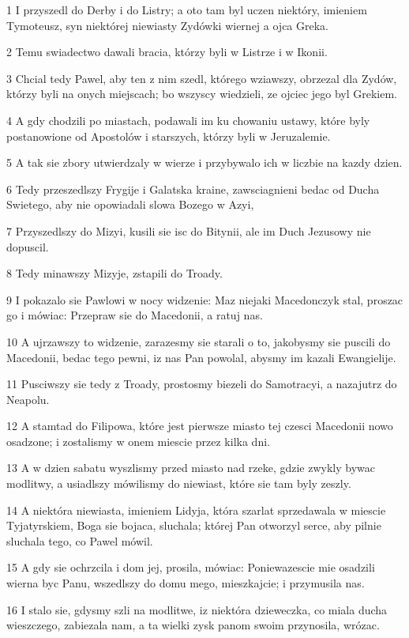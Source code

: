 \par 1 I przyszedl do Derby i do Listry; a oto tam byl uczen niektóry, imieniem Tymoteusz, syn niektórej niewiasty Zydówki wiernej a ojca Greka.
\par 2 Temu swiadectwo dawali bracia, którzy byli w Listrze i w Ikonii.
\par 3 Chcial tedy Pawel, aby ten z nim szedl, którego wziawszy, obrzezal dla Zydów, którzy byli na onych miejscach; bo wszyscy wiedzieli, ze ojciec jego byl Grekiem.
\par 4 A gdy chodzili po miastach, podawali im ku chowaniu ustawy, które byly postanowione od Apostolów i starszych, którzy byli w Jeruzalemie.
\par 5 A tak sie zbory utwierdzaly w wierze i przybywalo ich w liczbie na kazdy dzien.
\par 6 Tedy przeszedlszy Frygije i Galatska kraine, zawsciagnieni bedac od Ducha Swietego, aby nie opowiadali slowa Bozego w Azyi,
\par 7 Przyszedlszy do Mizyi, kusili sie isc do Bitynii, ale im Duch Jezusowy nie dopuscil.
\par 8 Tedy minawszy Mizyje, zstapili do Troady.
\par 9 I pokazalo sie Pawlowi w nocy widzenie: Maz niejaki Macedonczyk stal, proszac go i mówiac: Przepraw sie do Macedonii, a ratuj nas.
\par 10 A ujrzawszy to widzenie, zarazesmy sie starali o to, jakobysmy sie puscili do Macedonii, bedac tego pewni, iz nas Pan powolal, abysmy im kazali Ewangielije.
\par 11 Pusciwszy sie tedy z Troady, prostosmy biezeli do Samotracyi, a nazajutrz do Neapolu.
\par 12 A stamtad do Filipowa, które jest pierwsze miasto tej czesci Macedonii nowo osadzone; i zostalismy w onem miescie przez kilka dni.
\par 13 A w dzien sabatu wyszlismy przed miasto nad rzeke, gdzie zwykly bywac modlitwy, a usiadlszy mówilismy do niewiast, które sie tam byly zeszly.
\par 14 A niektóra niewiasta, imieniem Lidyja, która szarlat sprzedawala w miescie Tyjatyrskiem, Boga sie bojaca, sluchala; której Pan otworzyl serce, aby pilnie sluchala tego, co Pawel mówil.
\par 15 A gdy sie ochrzcila i dom jej, prosila, mówiac: Poniewazescie mie osadzili wierna byc Panu, wszedlszy do domu mego, mieszkajcie; i przymusila nas.
\par 16 I stalo sie, gdysmy szli na modlitwe, iz niektóra dzieweczka, co miala ducha wieszczego, zabiezala nam, a ta wielki zysk panom swoim przynosila, wrózac.
